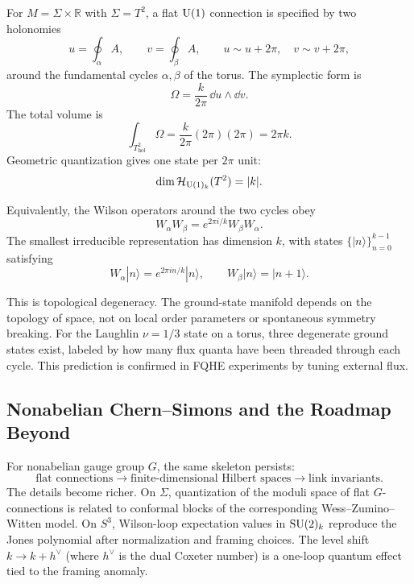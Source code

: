 For $M=\Sigma\times\mathbb R$ with $\Sigma=T^2$, a flat $\operatorname{U}(1)$ connection is specified by two holonomies
\begin{equation}
  u=\oint_\alpha A,
  \qquad
  v=\oint_\beta A,
  \qquad
  u\sim u+2\pi,\quad v\sim v+2\pi,
  \label{eq:fqhe-holonomies}
\end{equation}
around the fundamental cycles $\alpha,\beta$ of the torus. The symplectic form is
\begin{equation}
  \Omega
  =
  \frac{k}{2\pi}\,\dd u\wedge\dd v.
  \label{eq:fqhe-symplectic-torus}
\end{equation}
The total volume is
\begin{equation}
  \int_{T^2_{\mathrm{hol}}}\Omega
  =
  \frac{k}{2\pi}(2\pi)(2\pi)
  =
  2\pi k.
  \label{eq:fqhe-torus-volume}
\end{equation}
Geometric quantization gives one state per $2\pi$ unit:
\begin{equation}
  \dim\mathcal H_{\operatorname{U}(1)_k}(T^2)=|k|.
  \label{eq:fqhe-u1-dim}
\end{equation}

Equivalently, the Wilson operators around the two cycles obey
\begin{equation}
  W_\alpha W_\beta
  =
  e^{2\pi i/k}W_\beta W_\alpha.
  \label{eq:fqhe-clock-shift}
\end{equation}
The smallest irreducible representation has dimension $k$, with states $\{|n\rangle\}_{n=0}^{k-1}$ satisfying
\begin{equation}
  W_\alpha|n\rangle=e^{2\pi i n/k}|n\rangle,
  \qquad
  W_\beta|n\rangle=|n+1\rangle.
  \label{eq:fqhe-clock-shift-rep}
\end{equation}

This is topological degeneracy. The ground-state manifold depends on the topology of space, not on local order parameters or spontaneous symmetry breaking. For the Laughlin $\nu=1/3$ state on a torus, three degenerate ground states exist, labeled by how many flux quanta have been threaded through each cycle. This prediction is confirmed in FQHE experiments by tuning external flux.

\subsection{Nonabelian Chern--Simons and the Roadmap Beyond}
\label{subsec:fqhe-nonabelian}

For nonabelian gauge group $G$, the same skeleton persists:
\[
\text{flat connections}
\longrightarrow
\text{finite-dimensional Hilbert spaces}
\longrightarrow
\text{link invariants}.
\]
The details become richer. On $\Sigma$, quantization of the moduli space of flat $G$-connections is related to conformal blocks of the corresponding Wess--Zumino--Witten model. On $S^3$, Wilson-loop expectation values in $\operatorname{SU}(2)_k$ reproduce the Jones polynomial after normalization and framing choices. The level shift $k\to k+h^\vee$ (where $h^\vee$ is the dual Coxeter number) is a one-loop quantum effect tied to the framing anomaly.

